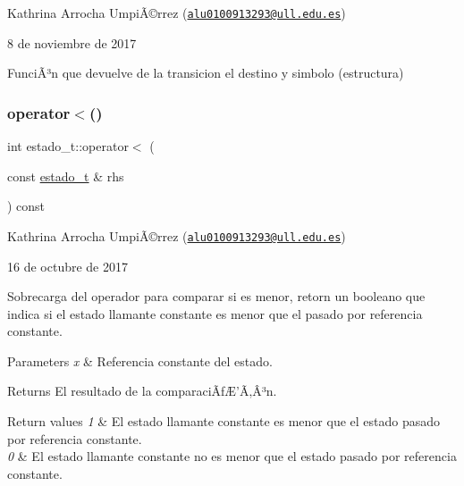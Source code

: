 Kathrina Arrocha UmpiÃ©rrez (\href{mailto:alu0100913293@ull.edu.es}{\tt alu0100913293@ull.\+edu.\+es})

8 de noviembre de 2017

FunciÃ³n que devuelve de la transicion el destino y simbolo (estructura) \mbox{\label{classestado__t_ae05cc164f6ac82bf50b92a826a120b39}} 
\subsubsection{\texorpdfstring{operator$<$()}{operator<()}}
{\footnotesize\ttfamily int estado\+\_\+t\+::operator$<$ (\begin{DoxyParamCaption}\item[{const \hyperlink{classestado__t}{estado\+\_\+t} \&}]{rhs }\end{DoxyParamCaption}) const}

Kathrina Arrocha UmpiÃ©rrez (\href{mailto:alu0100913293@ull.edu.es}{\tt alu0100913293@ull.\+edu.\+es})

16 de octubre de 2017

Sobrecarga del operador para comparar si es menor, retorn un booleano que indica si el estado llamante constante es menor que el pasado por referencia constante.


\begin{DoxyParams}{Parameters}
{\em x} & Referencia constante del estado. \\
\hline
\end{DoxyParams}
\begin{DoxyReturn}{Returns}
El resultado de la comparaciÃƒÆ’Ã‚Â³n. 
\end{DoxyReturn}

\begin{DoxyRetVals}{Return values}
{\em 1} & El estado llamante constante es menor que el estado pasado por referencia constante. \\
\hline
{\em 0} & El estado llamante constante no es menor que el estado pasado por referencia constante. \\
\hline
\end{DoxyRetVals}
\mbox{\label{classestado__t_ad7a36a03430853701e4591e05187a14e}} 
